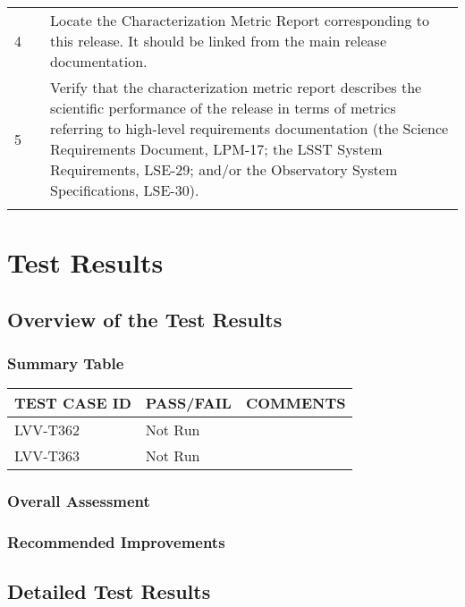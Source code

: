 \documentclass[DM,lsstdraft,STR,toc]{lsstdoc}
\begin{document}
\begin{longtable}[]{p{1.3cm}p{2cm}p{13cm}}
            \multirow{1}{*}{ 4 } &  &
            \begin{minipage}[t]{13cm}{\footnotesize
Locate the Characterization Metric Report corresponding to this release. It should be linked from the main release documentation.
            \vspace{\dp0}
            } \end{minipage} \\ \cline{2-3}

            \multirow{1}{*}{ 5 } &  &
            \begin{minipage}[t]{13cm}{\footnotesize
Verify that the characterization metric report describes the scientific performance of the release in terms of metrics referring to high-level requirements documentation (the Science Requirements Document, LPM-17; the LSST System Requirements, LSE-29; and/or the Observatory System Specifications, LSE-30).
            \vspace{\dp0}
            } \end{minipage} \\ \cline{2-3}

        \\ \midrule
    \end{longtable}

\newpage

\section{Test Results}
\label{sect:testresults}

\subsection{Overview of the Test Results}
\label{sect:overview}

\subsubsection{Summary Table}
\label{sect:summarytable}


\begin{longtable} {|p{}|p{}|p{}|}
\hline
{\bf TEST CASE ID} & {\bf PASS/FAIL} & {\bf COMMENTS} \\\hline
LVV-T362 & Not Run & \\\hline
LVV-T363 & Not Run & \\\hline
\end{longtable}

\subsubsection{Overall Assessment}
\label{sect:overallassessment}


\subsubsection{Recommended Improvements}
\label{sect:recommendations}

\subsection{Detailed Test Results}
\label{sect:detailedtestresults}
\end{document}
